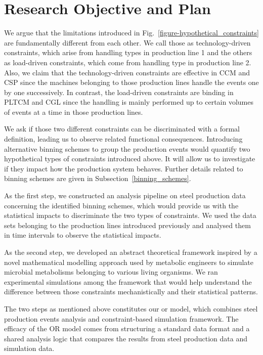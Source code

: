 \section{Research Objective and Plan}

We argue that the limitations introduced in Fig.~\ref{figure-hypothetical_constraints} are fundamentally different from each other. We call those as technology-driven constraints, which arise from handling types in production line 1 and the others as load-driven constraints, which come from handling type in production line 2. Also, we claim that the technology-driven constraints are effective in CCM and CSP since the machines belonging to those production lines handle the events one by one successively. In contrast, the load-driven constraints are binding in PLTCM and CGL since the handling is mainly performed up to certain volumes of events at a time in those production lines.

We ask if those two different constraints can be discriminated with a formal definition, leading us to observe related functional consequences. Introducing alternative binning schemes to group the production events would quantify two hypothetical types of constraints introduced above. It will allow us to investigate if they impact how the production system behaves. Further details related to binning schemes are given in Subsection~\ref{binning_schemes}.

As the first step, we constructed an analysis pipeline on steel production data concerning the identified binning schemes, which would provide us with the statistical impacts to discriminate the two types of constraints. We used the data sets belonging to the production lines introduced previously and analysed them in time intervals to observe the statistical impacts. 

As the second step, we developed an abstract theoretical framework inspired by a novel mathematical modelling approach used by metabolic engineers to simulate microbial metabolisms belonging to various living organisms. We ran experimental simulations among the framework that would help understand the difference between those constraints mechanistically and their statistical patterns.

The two steps as mentioned above constitutes our \ac{or} model, which combines steel production events analysis and constraint-based simulation framework. The efficacy of the OR model comes from structuring a standard data format and a shared analysis logic that compares the results from steel production data and simulation data.